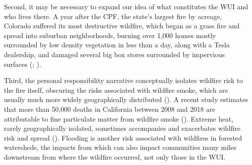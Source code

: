 \documentclass[
]{article}
\begin{document}
Second, it may be necessary to expand our idea of what constitutes the WUI and who lives there. A year after the CPF, the state's largest fire by acreage, Colorado suffered its most destructive wildfire, which began as a grass fire and spread into suburban neighborhoods, burning over 1,000 homes mostly surrounded by low density vegetation in less than a day, along with a Tesla dealership, and damaged several big box stores surrounded by impervious surfaces (; ).

Third, the personal responsibility narrative conceptually isolates wildfire risk to the fire itself, obscuring the risks associated with wildfire smoke, which are usually much more widely geographically distributed (). A recent study estimates that more than 50,000 deaths in California between 2008 and 2018 are attributable to fine particulate matter from wildfire smoke (). Extreme heat, rarely geographically isolated, sometimes accompanies and exacerbates wildfire risk and spread (). Flooding is another risk associated with wildfires in forested watersheds, the impacts from which can also impact communities many miles downstream from where the wildfire occurred, not only those in the WUI.
\end{document}
